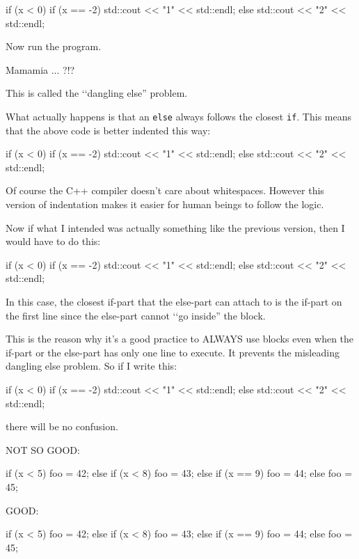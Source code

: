 \begin{console}
if (x < 0)
   if (x == -2) std::cout << "1" << std::endl;
else
   std::cout << "2" << std::endl; 
\end{console}
Now run the program.

Mamamia ... ?!?

This is called the \lq\lq dangling else'' problem.

What actually happens is that an \texttt{else} always follows the closest
\texttt{if}. This means that the above code is better indented this way:
\begin{console}
if (x < 0)
   if (x == -2) std::cout << "1" << std::endl;
   else
       std::cout << "2" << std::endl; 
\end{console}

Of course the C++ compiler doesn't care about
whitespaces. However this version of indentation makes it easier for
human beings to follow the logic.

Now if what I intended was actually something like the previous version,
then I would have to do this:
\begin{console}
if (x < 0)
{
   if (x == -2) std::cout << "1" << std::endl;
}
else
    std::cout << "2" << std::endl; 
\end{console}
In this case, the closest if-part that the else-part can attach to is
the if-part on the first line since the else-part cannot \lq\lq go inside''
the block.

This is the reason why it's a good practice to ALWAYS
use blocks even when the if-part or the else-part has only one line to
execute. It prevents the misleading dangling else problem. So if I write
this:
\begin{console}
if (x < 0)
{
   if (x == -2)
   {
       std::cout << "1" << std::endl;
   }
}
else
{
     std::cout << "2" << std::endl;
}
\end{console}

there will be no confusion.

\newpage{}

NOT SO GOOD:\\
\begin{console}
if (x < 5)
{
    foo = 42;
}
else
{
     if (x < 8)
     {
         foo = 43;
     }
     else
     {
         if (x == 9)
         {
             foo = 44;
         }
         else
         {
             foo = 45;
         }
     }
}
\end{console}
GOOD:\\
\begin{console}
if (x < 5)
{
    foo = 42;
}
else if (x < 8)
{
    foo = 43;
}
else if (x == 9)
{
    foo = 44;
}
else
{
    foo = 45;
}
\end{console}

